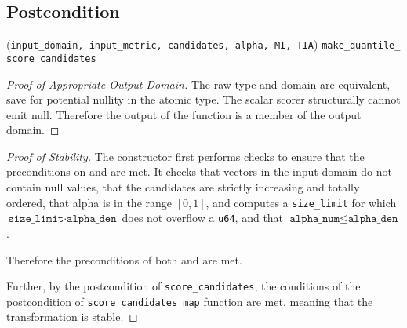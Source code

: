 \documentclass{article}
\begin{document}
\subsection*{Postcondition}
\validTransformation
    {(\texttt{input\_domain, input\_metric, candidates, alpha, MI, TIA})}
    {\texttt{make\_quantile\_\\score\_candidates}}


\begin{proof}[Proof of Appropriate Output Domain]
    \label{sec:approp-output-domain}
    The raw type and domain are equivalent, save for potential nullity in the atomic type. 
    The scalar scorer structurally cannot emit null.
    Therefore the output of the function is a member of the output domain.
\end{proof}

\begin{proof}[Proof of Stability]
    \label{sec:stability}
    The constructor first performs checks to ensure that the preconditions on  and  are met.
    It checks that vectors in the input domain do not contain null values,
    that the candidates are strictly increasing and totally ordered,
    that alpha is in the range $[0, 1]$,
    and computes a \texttt{size\_limit} for which $\texttt{size\_limit} \cdot \texttt{alpha\_den}$ does not overflow a \texttt{u64},
    and that $\texttt{alpha\_num} \le \texttt{alpha\_den}$.

    Therefore the preconditions of both  and  are met.

    Further, by the postcondition of \texttt{score\_candidates},
    the conditions of the postcondition of \texttt{score\_candidates\_map} function are met,
    meaning that the transformation is stable.
\end{proof}



\end{document}
